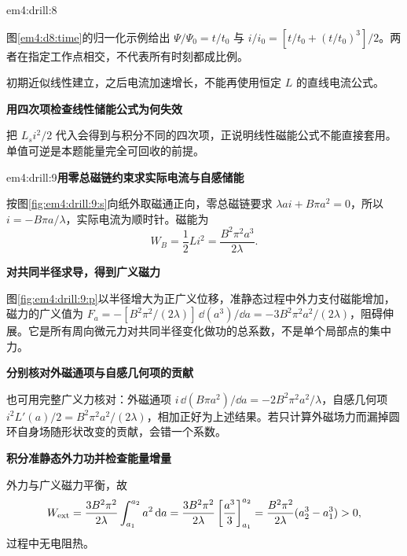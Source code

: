 \begin{drillsolution}{em4:drill:8}
{\begin{tikzpicture}
\end{tikzpicture}}
图\ref{em4:d8:time}的归一化示例给出 $\Psi/\Psi_0=t/t_0$ 与 $i/i_0=[t/t_0+(t/t_0)^3]/2$。两者在指定工作点相交，不代表所有时刻都成比例。


初期近似线性建立，之后电流加速增长，不能再使用恒定 $L$ 的直线电流公式。

\par\medskip{}\noindent\textbf{用四次项检查线性储能公式为何失效}\par\nobreak
把 $L_s i^2/2$ 代入会得到与积分不同的四次项，正说明线性磁能公式不能直接套用。单值可逆是本题能量完全可回收的前提。\end{drillsolution}
\begin{drillsolution}{em4:drill:9}\textbf{用零总磁链约束求实际电流与自感储能}\par\nobreak
按图\ref{fig:em4:drill:9:s}向纸外取磁通正向，零总磁链要求 $\lambda ai+B\pi a^2=0$，所以 $i=-B\pi a/\lambda$，实际电流为顺时针。磁能为
\[W_B=\frac12L i^2=\frac{B^2\pi^2a^3}{2\lambda}.\]



\par\medskip{}\noindent\textbf{对共同半径求导，得到广义磁力}\par\nobreak
图\ref{fig:em4:drill:9:p}以半径增大为正广义位移，准静态过程中外力支付磁能增加，磁力的广义值为 $F_a=-[B^2\pi^2/(2\lambda)]\,\dd(a^3)/\dd a
=-3B^2\pi^2a^2/(2\lambda)$，阻碍伸展。它是所有周向微元力对共同半径变化做功的总系数，不是单个局部点的集中力。



\par\medskip{}\noindent\textbf{分别核对外磁通项与自感几何项的贡献}\par\nobreak
也可用完整广义力核对：外磁通项 $i\,\dd(B\pi a^2)/\dd a=-2B^2\pi^2a^2/\lambda$，自感几何项 $i^2L'(a)/2=B^2\pi^2a^2/(2\lambda)$，相加正好为上述结果。若只计算外磁场力而漏掉圆环自身场随形状改变的贡献，会错一个系数。

\par\medskip{}\noindent\textbf{积分准静态外力功并检查能量增量}\par\nobreak
外力与广义磁力平衡，故
\[
W_{\rm ext}=\frac{3B^2\pi^2}{2\lambda}\int_{a_1}^{a_2}a^2\mathop{}\!\mathrm d a
=\frac{3B^2\pi^2}{2\lambda}\left[\frac{a^3}{3}\right]_{a_1}^{a_2}
=\frac{B^2\pi^2}{2\lambda}(a_2^3-a_1^3)>0,
\]过程中无电阻热。\end{drillsolution}
